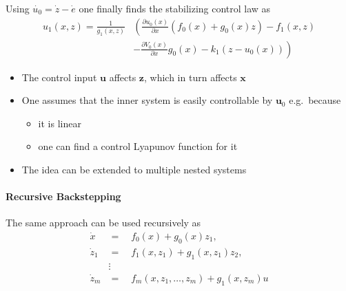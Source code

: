 Using $\dot{u_0}=\dot{z}-\dot{e}$ one finally finds the stabilizing control law as
\begin{align*}
    u_1(x,z)  = \frac{1}{g_1(x,z)} & \left(\frac{\partial u_0(x)}{\partial x}\left(f_0(x)+g_0(x)z\right)-f_1(x,z) \right. \\
                                   & \left. -\frac{\partial V_0(x)}{\partial x}g_0(x)-k_1(z-u_0(x))\right)
\end{align*}

\newpar{}

\begin{itemize}
    \item The control input $\mathbf{u}$ affects $\mathbf{z}$, which in turn affects $\mathbf{x}$
    \item One assumes that the inner system is easily controllable by $\mathbf{u}_0$ e.g.\ because
          \begin{itemize}
              \item it is linear
              \item one can find a control Lyapunov function for it
          \end{itemize}
    \item The idea can be extended to multiple nested systems
\end{itemize}

\paragraph{Recursive Backstepping}
The same approach can be used recursively as
\begin{align*}
    \dot{x}     & =\quad f_{0}(x)+g_{0}(x)z_{1},                     \\
    \dot{z}_{1} & =\quad f_{1}(x,z_{1})+g_{1}(x,z_{1})z_{2},         \\
                & \vdots                                             \\
    \dot{z}_{m} & =\quad f_{m}(x,z_{1},\ldots,z_{m})+g_{1}(x,z_{m})u
\end{align*}

